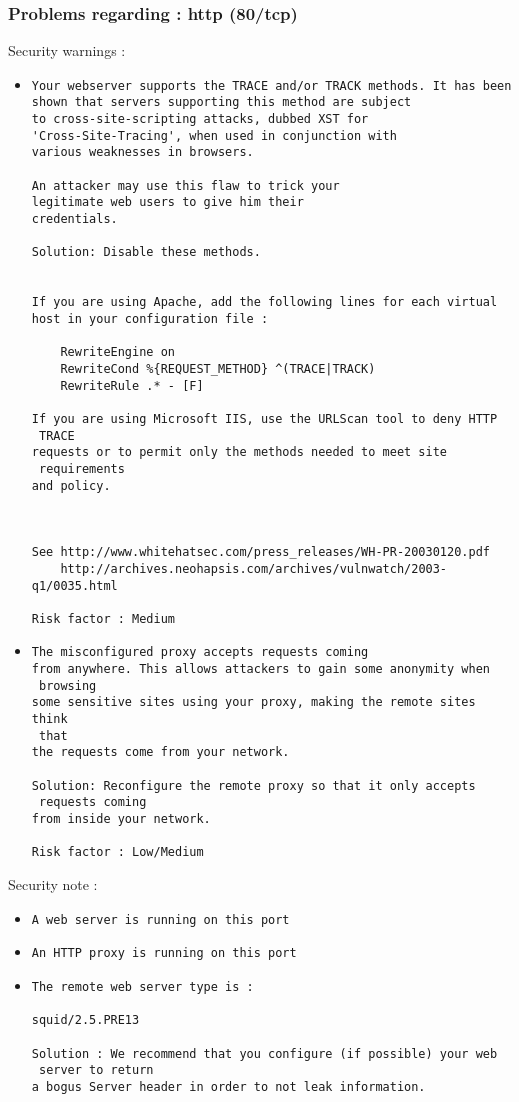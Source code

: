 \documentclass{article}
\begin{document}
\subsubsection{Problems regarding : http (80/tcp)}
Security warnings :\\
\begin{itemize}
\item \begin{verbatim}
Your webserver supports the TRACE and/or TRACK methods. It has been
shown that servers supporting this method are subject
to cross-site-scripting attacks, dubbed XST for
'Cross-Site-Tracing', when used in conjunction with
various weaknesses in browsers.

An attacker may use this flaw to trick your
legitimate web users to give him their 
credentials.

Solution: Disable these methods.


If you are using Apache, add the following lines for each virtual
host in your configuration file :

    RewriteEngine on
    RewriteCond %{REQUEST_METHOD} ^(TRACE|TRACK)
    RewriteRule .* - [F]

If you are using Microsoft IIS, use the URLScan tool to deny HTTP
 TRACE
requests or to permit only the methods needed to meet site
 requirements
and policy.



See http://www.whitehatsec.com/press_releases/WH-PR-20030120.pdf
    http://archives.neohapsis.com/archives/vulnwatch/2003-q1/0035.html

Risk factor : Medium
\end{verbatim}\item \begin{verbatim}
The misconfigured proxy accepts requests coming
from anywhere. This allows attackers to gain some anonymity when
 browsing 
some sensitive sites using your proxy, making the remote sites think
 that
the requests come from your network.

Solution: Reconfigure the remote proxy so that it only accepts
 requests coming 
from inside your network.
 
Risk factor : Low/Medium
\end{verbatim}\end{itemize}
Security note :\\
\begin{itemize}
\item \begin{verbatim}
A web server is running on this port
\end{verbatim}\item \begin{verbatim}
An HTTP proxy is running on this port
\end{verbatim}\item \begin{verbatim}
The remote web server type is :

squid/2.5.PRE13

Solution : We recommend that you configure (if possible) your web
 server to return
a bogus Server header in order to not leak information.

\end{verbatim}\end{itemize}
\end{document}
